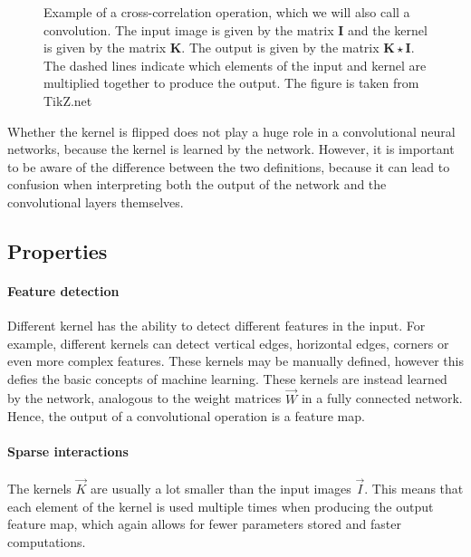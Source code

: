         \begin{figure}[h!]
            \centering
            
            \caption{ Example of a cross-correlation operation, which we will also call a convolution. The input image is given by the matrix $\mathbf I$ and the kernel is given by the matrix $\mathbf K$. The output is given by the matrix $\mathbf{K \star I}$. The dashed lines indicate which elements of the input and kernel are multiplied together to produce the output. The figure is taken from TikZ.net }
            \label{fig:ML:CNN:convolution:convolution_operation_map_example}
        \end{figure}
        Whether the kernel is flipped does not play a huge role in a convolutional neural networks, because the kernel is learned by the network. However, it is important to be aware of the difference between the two definitions, because it can lead to confusion when interpreting both the output of the network and the convolutional layers themselves. 

    \subsection{Properties}
        \paragraph{Feature detection}
            Different kernel has the ability to detect different features in the input. For example, different kernels can detect vertical edges, horizontal edges, corners or even more complex features. These kernels may be manually defined, however this defies the basic concepts of machine learning. These kernels are instead learned by the network, analogous to the weight matrices $\vec{W}$ in a fully connected network. Hence, the output of a convolutional operation is a feature map. 

        \paragraph{Sparse interactions}
            The kernels $\vec{K}$ are usually a lot smaller than the input images $\vec{I}$. This means that each element of the kernel is used multiple times when producing the output feature map, which again allows for fewer parameters stored and faster computations. 

